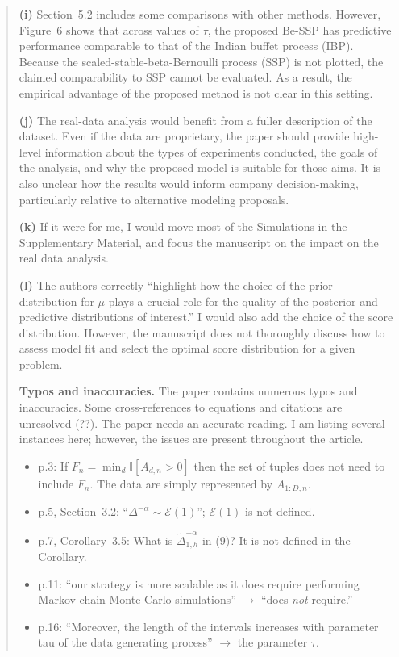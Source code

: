 \begin{quote}
\textbf{(i)} Section~5.2 includes some comparisons with other
methods. However, Figure~6 shows that across values of $\tau$, the
proposed Be-SSP has predictive performance comparable to that of the
Indian buffet process (IBP). Because the scaled-stable-beta-Bernoulli
process (SSP) is not plotted, the claimed comparability to SSP cannot
be evaluated. As a result, the empirical advantage of the proposed
method is not clear in this setting.

\textbf{(j)} The real-data analysis would benefit from a fuller
description of the dataset. Even if the data are proprietary, the
paper should provide high-level information about the types of
experiments conducted, the goals of the analysis, and why the proposed
model is suitable for those aims. It is also unclear how the results
would inform company decision-making, particularly relative to
alternative modeling proposals.

\textbf{(k)} If it were for me, I would move most of the Simulations
in the Supplementary Material, and focus the manuscript on the impact
on the real data analysis.

\textbf{(l)} The authors correctly ``highlight how the choice of the
prior distribution for $\mu$ plays a crucial role for the quality of
the posterior and predictive distributions of interest.'' I would also
add the choice of the score distribution. However, the manuscript does
not thoroughly discuss how to assess model fit and select the optimal
score distribution for a given problem.

\medskip
\textbf{Typos and inaccuracies.}
The paper contains numerous typos and inaccuracies. Some
cross-references to equations and citations are unresolved (??). The
paper needs an accurate reading. I am listing several instances here;
however, the issues are present throughout the article.
\begin{itemize}[leftmargin=*]
  \item p.3: If $F_n = \min_d \mathbb{I}[A_{d,n} > 0]$ then the set
        of tuples does not need to include $F_n$. The data are simply
        represented by $A_{1:D,n}$.
  \item p.5, Section~3.2: ``$\Delta^{-\alpha} \sim \mathcal{E}(1)$'';
        $\mathcal{E}(1)$ is not defined.
  \item p.7, Corollary~3.5: What is
        $\tilde\Delta_{1,h}^{-\alpha}$ in (9)? It is not defined in
        the Corollary.
  \item p.11: ``our strategy is more scalable as it does require
        performing Markov chain Monte Carlo simulations'' $\to$
        ``does \emph{not} require.''
  \item p.16: ``Moreover, the length of the intervals increases with
        parameter tau of the data generating process'' $\to$ the
        parameter $\tau$.
\end{itemize}
\end{quote}
